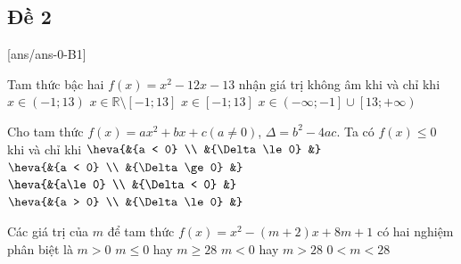 \subsection{Đề 2}	
[ans/ans-0-B1]
\caulc
\begin{ex}%
	Tam thức bậc hai $f(x)=x^2-12x-13$ nhận giá trị không âm khi và chỉ khi
	\choice
	{$x\in \left(-1;13\right)$}
	{$x\in \mathbb{R}\setminus \left[-1;13\right]$}
	{$x\in \left[-1;13\right]$}
	{\True $x\in \left(-\infty;-1\right]\cup \left[13;+\infty \right)$}
	\loigiai{
		$f(x)=0\Leftrightarrow x^2-12x-13=0\Leftrightarrow \hoac{&{x=-1} \\
			&{x=13.}
			&}$\\
		Bảng xét dấu của $f(x)$
		\begin{center}
			\begin{tikzpicture}[>=stealth]
				\tkzTabInit[nocadre=false,lgt=1.5,espcl=2,deltacl=0.6]{$x$/.7 ,$f(x)$/.7}
				{$-\infty$ , $-1$ , $13$ , $+\infty$}
				\tkzTabLine{ , + , $0$ , - , $0$ , + , }
			\end{tikzpicture}
		\end{center}		
		Vậy $f(x)\ge 0\Leftrightarrow x\in \left(-\infty;-1\right]\cup \left[13;+\infty \right)$.
	}
\end{ex}
\begin{ex}%
	Cho tam thức $f(x)=ax^2+bx+c\left(a\ne 0\right)$, $\Delta=b^2-4ac$. Ta có $f(x)\le 0$ khi và chỉ khi
	\choice
	{\True $\heva{&{a < 0} \\
			&{\Delta \le 0}
			&}$}
	{$\heva{&{a < 0} \\
			&{\Delta \ge 0}
			&}$}
	{$\heva{&{a\le 0} \\
			&{\Delta < 0}
			&}$}
	{$\heva{&{a > 0} \\
			&{\Delta \le 0}
			&}$}
\end{ex}
\begin{ex}%
	Các giá trị của $m$ để tam thức $f(x)=x^2-\left(m+2\right)x+8m+1$ có hai nghiệm phân biệt là
	\choice
	{$m > 0$}
	{$m\le 0$ hay $m\ge 28$}
	{\True $m < 0$ hay $m > 28$}
	{$0< m < 28$}
\end{ex}
